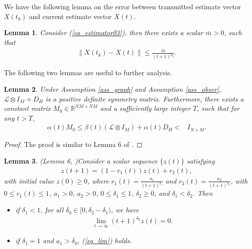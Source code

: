 \documentclass[10pt,journal,final]{IEEEtran}
\newcommand{\norm}[1]{\left\lVert#1\right\rVert}
\theoremstyle{plain}
\newtheorem{lemma}{\textbf{Lemma}}[section]
\theoremstyle{definition}
\theoremstyle{remark}
\begin{document}
We have the following lemma on the error between transmitted estimate vector $X(t_{k})$ and current estimate vector $X(t)$.
\begin{lemma}\label{eq_error_trans}
	Consider (\ref{eq_estimator03}), then there exists a scalar $\bar m>0$, such that
	\begin{align}
\norm{X(t_{k})-X(t)}\leq  \frac{\bar m}{(t+1)^{\rho_0}}.
	\end{align}
\end{lemma}
The following two lemmas are useful to further analysis.
\begin{lemma}\label{lem_posit}
	Under Assumption \ref{ass_graph} and Assumption \ref{ass_obser}, $\mathcal{L}\otimes I_M+D_H$ is a positive definite symmetry matrix. Furthermore, there exists a  constant matrix $M_0\in\mathbb{R}^{NM \times NM}$ and a sufficiently large integer $T$, such that for any $t>T$, 
	\begin{align*}
\alpha(t) M_0\leq \beta(t)(\mathcal{L}\otimes I_M)+\alpha(t)D_H
< & I_{N\times M}.
	\end{align*}
\end{lemma}
\begin{proof}
	The proof is similar to Lemma 6 of \cite{kar2011convergence}.
\end{proof}

\begin{lemma}(Lemma 6, \cite{kar2013distributed})\label{lem_scalar}
Consider a scalar sequence $\{z(t)\}$  satisfying
	\begin{align*}
	z(t+1)= (1-r_1(t))z(t)+r_2(t),
	\end{align*}
	 with initial value $z(0)\geq 0$,
	where $r_1(t)=\frac{a_1}{(t+1)^{\delta_1}}$ and $r_2(t)= \frac{a_2}{(t+1)^{\delta_2}}$, with $0\leq r_1(t)\leq 1$, $a_1>0$,  $a_2>0$, $0\leq\delta_1\leq 1$, $\delta_2\geq 0$, and  $\delta_1<\delta_2$. Then
	\begin{itemize}
		\item if $\delta_1<1$, for all $\delta_0\in[0,\delta_2-\delta_1)$, we have
		  \begin{align}\label{eq_lim}
	\lim\limits_{t\rightarrow\infty}(t+1)^{\delta_0}z(t)=0.
		  \end{align}
		  \item if $\delta_1=1$ and $a_1>\delta_0$, (\ref{eq_lim}) holds.
	\end{itemize}
\end{lemma}
\end{document}
